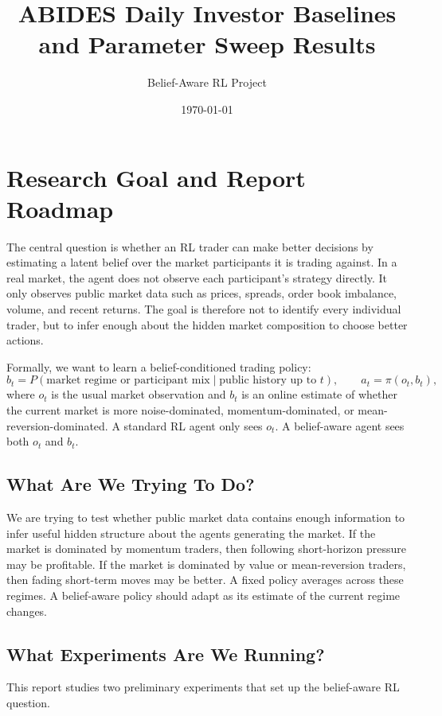 \documentclass[11pt]{article}
\title{ABIDES Daily Investor Baselines and Parameter Sweep Results}
\author{Belief-Aware RL Project}
\date{\today}
\begin{document}
\maketitle

\section{Research Goal and Report Roadmap}

The central question is whether an RL trader can make better decisions by
estimating a latent belief over the market participants it is trading against.
In a real market, the agent does not observe each participant's strategy
directly. It only observes public market data such as prices, spreads, order
book imbalance, volume, and recent returns. The goal is therefore not to
identify every individual trader, but to infer enough about the hidden market
composition to choose better actions.

Formally, we want to learn a belief-conditioned trading policy:
\[
    b_t = P(\text{market regime or participant mix} \mid \text{public history up to } t),
    \qquad
    a_t = \pi(o_t, b_t),
\]
where \(o_t\) is the usual market observation and \(b_t\) is an online estimate
of whether the current market is more noise-dominated, momentum-dominated, or
mean-reversion-dominated. A standard RL agent only sees \(o_t\). A belief-aware
agent sees both \(o_t\) and \(b_t\).

\subsection{What Are We Trying To Do?}

We are trying to test whether public market data contains enough information to
infer useful hidden structure about the agents generating the market. If the
market is dominated by momentum traders, then following short-horizon pressure
may be profitable. If the market is dominated by value or mean-reversion
traders, then fading short-term moves may be better. A fixed policy averages
across these regimes. A belief-aware policy should adapt as its estimate of the
current regime changes.

\subsection{What Experiments Are We Running?}

This report studies two preliminary experiments that set up the belief-aware RL
question.
\end{document}
